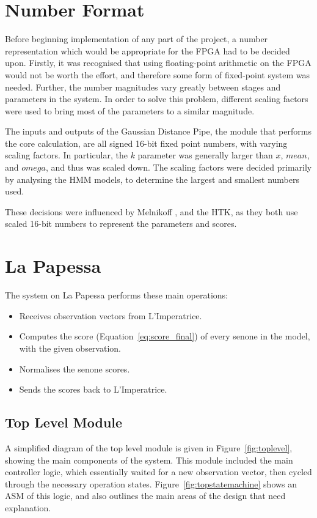 \section{Number Format} %
\label{sec:number_format}
	Before beginning implementation of any part of the project, a number representation which would be appropriate for the FPGA had to be decided upon.  Firstly, it was recognised that using floating-point arithmetic on the FPGA would not be worth the effort, and therefore some form of fixed-point system was needed.  Further, the number magnitudes vary greatly between stages and parameters in the system.  In order to solve this problem, different scaling factors were used to bring most of the parameters to a similar magnitude.  

	The inputs and outputs of the Gaussian Distance Pipe, the module that performs the core calculation, are all signed 16-bit fixed point numbers, with varying scaling factors.  In particular, the $k$ parameter was generally larger than $x$, $mean$, and $omega$, and thus was scaled down.  The scaling factors were decided primarily by analysing the HMM models, to determine the largest and smallest numbers used.

	These decisions were influenced by Melnikoff \cite{melnikoff2003speech}, and the HTK, as they both use scaled 16-bit numbers to represent the parameters and scores.


\section{La Papessa} %
\label{sec:la_papessa_fpga}

	The system on La Papessa performs these main operations:
	\begin{itemize}
		\item Receives observation vectors from L'Imperatrice.
		\item Computes the score (Equation~\ref{eq:score_final}) of every senone in the model, with the given observation.
		\item Normalises the senone scores.
		\item Sends the scores back to L'Imperatrice.
	\end{itemize}

	\subsection{Top Level Module} %
	\label{sub:top_level_module}
		A simplified diagram of the top level module is given in Figure~\ref{fig:toplevel}, showing the main components of the system.  This module included the main controller logic, which essentially waited for a new observation vector, then cycled through the necessary operation states.  Figure~\ref{fig:topstatemachine} shows an ASM of this logic, and also outlines the main areas of the design that need explanation.

